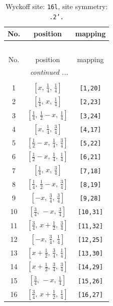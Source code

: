 \documentclass[fleqn,8pt]{jsarticle}
\begin{document}
\renewcommand{\arraystretch}{1.2}
\begin{longtable}{ccc}
\caption{Wyckoff site: {\tt 16l}, site symmetry: {\tt .2'.}}
 \\
 \hline \hline
No. & position & mapping \\ \hline \endfirsthead

\multicolumn{2}{l}{\tablename\ \thetable{}} \\
 \hline \hline
No. & position & mapping \\ \hline \endhead

 \hline \hline
\multicolumn{2}{r}{\footnotesize\it continued ...} \\ \endfoot

 \hline \hline
\multicolumn{2}{r}{} \\ \endlastfoot

1 & $\left[ x,\, \frac{1}{4},\, \frac{1}{4} \right]$ & {\tt [1,20]} \\ \hline
2 & $\left[ \frac{1}{4},\, x,\, \frac{1}{4} \right]$ & {\tt [2,23]} \\ \hline
3 & $\left[ \frac{1}{4},\, \frac{1}{2} - x,\, \frac{1}{4} \right]$ & {\tt [3,24]} \\ \hline
4 & $\left[ x,\, \frac{1}{4},\, \frac{3}{4} \right]$ & {\tt [4,17]} \\ \hline
5 & $\left[ \frac{1}{2} - x,\, \frac{1}{4},\, \frac{3}{4} \right]$ & {\tt [5,22]} \\ \hline
6 & $\left[ \frac{1}{2} - x,\, \frac{1}{4},\, \frac{1}{4} \right]$ & {\tt [6,21]} \\ \hline
7 & $\left[ \frac{1}{4},\, x,\, \frac{3}{4} \right]$ & {\tt [7,18]} \\ \hline
8 & $\left[ \frac{1}{4},\, \frac{1}{2} - x,\, \frac{3}{4} \right]$ & {\tt [8,19]} \\ \hline
9 & $\left[ - x,\, \frac{3}{4},\, \frac{3}{4} \right]$ & {\tt [9,28]} \\ \hline
10 & $\left[ \frac{3}{4},\, - x,\, \frac{3}{4} \right]$ & {\tt [10,31]} \\ \hline
11 & $\left[ \frac{3}{4},\, x + \frac{1}{2},\, \frac{3}{4} \right]$ & {\tt [11,32]} \\ \hline
12 & $\left[ - x,\, \frac{3}{4},\, \frac{1}{4} \right]$ & {\tt [12,25]} \\ \hline
13 & $\left[ x + \frac{1}{2},\, \frac{3}{4},\, \frac{1}{4} \right]$ & {\tt [13,30]} \\ \hline
14 & $\left[ x + \frac{1}{2},\, \frac{3}{4},\, \frac{3}{4} \right]$ & {\tt [14,29]} \\ \hline
15 & $\left[ \frac{3}{4},\, - x,\, \frac{1}{4} \right]$ & {\tt [15,26]} \\ \hline
16 & $\left[ \frac{3}{4},\, x + \frac{1}{2},\, \frac{1}{4} \right]$ & {\tt [16,27]} \\
\end{longtable}
\end{document}
